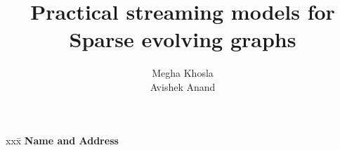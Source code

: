 \documentclass[11pt]{article}
\date{}
\title{Practical streaming models for Sparse evolving graphs}
\author{Megha Khosla \\
Avishek Anand
}
\begin{document}
\maketitle

\begin{tabbing}
xxx\= \kill
{\bf 
Name and Address
}
\end{tabbing}

\begin{centering}



\end{centering}

%
%




%



 


%




\end{document}
